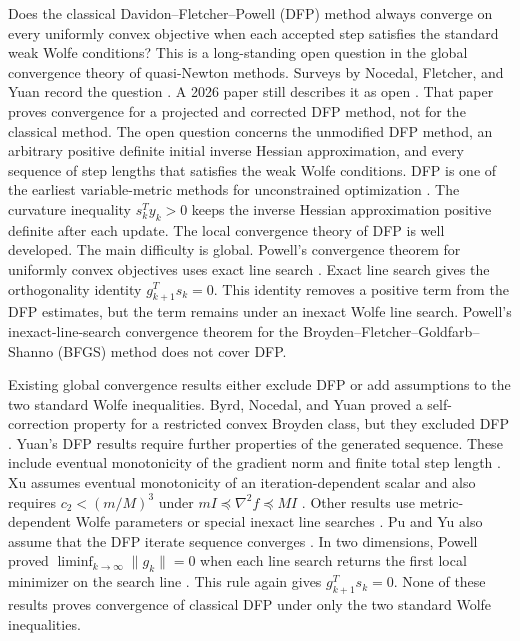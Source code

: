 \documentclass[11pt]{article}
\begin{document}
Does the classical Davidon--Fletcher--Powell (DFP) method always converge
on every uniformly convex objective when each accepted step satisfies the
standard weak Wolfe conditions?  This is a long-standing open question in the
global convergence theory of quasi-Newton methods.  Surveys by Nocedal,
Fletcher, and Yuan record the question
\cite{Nocedal1992,Fletcher1994,Yuan1999}.  A 2026 paper still describes it as
open \cite{YuanZhouPham2026}.  That paper proves convergence for a projected
and corrected DFP method, not for the classical method.  The open question
concerns the unmodified DFP method, an arbitrary positive definite initial
inverse Hessian approximation, and every sequence of step lengths that
satisfies the weak Wolfe conditions.  DFP is one of the earliest
variable-metric methods for unconstrained optimization
\cite{Davidon1991,FletcherPowell1963}.  The curvature inequality $s_k^Ty_k>0$
keeps the inverse Hessian approximation positive definite after each update.
The local convergence theory of DFP is well developed.  The main difficulty
is global.  Powell's convergence theorem for uniformly convex objectives uses
exact line search \cite{Powell1971}.  Exact line search gives the orthogonality
identity $g_{k+1}^Ts_k=0$.  This identity removes a positive term from the DFP
estimates, but the term remains under an inexact Wolfe line search.  Powell's
inexact-line-search convergence theorem for the
Broyden--Fletcher--Goldfarb--Shanno (BFGS) method \cite{Powell1976} does not
cover DFP.

Existing global convergence results either exclude DFP or add assumptions to
the two standard Wolfe inequalities.  Byrd, Nocedal, and Yuan proved a
self-correction property for a restricted convex Broyden class, but they
excluded DFP \cite{ByrdNocedalYuan1987}.  Yuan's DFP results require further
properties of the generated sequence.  These include eventual monotonicity of
the gradient norm and finite total step length \cite{Yuan1995}.  Xu assumes
eventual monotonicity of an iteration-dependent scalar and also requires
$c_2<(m/M)^3$ under $mI\preceq\nabla^2f\preceq MI$ \cite{Xu1997}.  Other
results use metric-dependent Wolfe parameters or special inexact line searches
\cite{Pu2002,LiuJingHan2002}.  Pu and Yu also assume that the DFP iterate
sequence converges \cite{PuYu1990}.  In two dimensions, Powell proved
$\liminf_{k\to\infty}\|g_k\|=0$ when each line search returns the first local
minimizer on the search line \cite{Powell2000}.  This rule again gives
$g_{k+1}^Ts_k=0$.  None of these results proves convergence of classical DFP
under only the two standard Wolfe inequalities.
\end{document}
